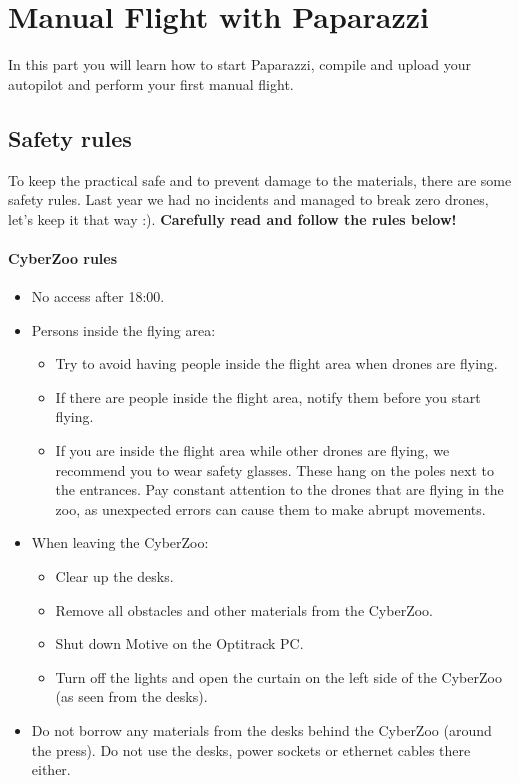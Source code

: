 \chapter{Manual Flight with Paparazzi}
\label{ch:manual_flight}
In this part you will learn how to start Paparazzi, compile and upload your autopilot and perform your first manual flight.

\section{Safety rules}
To keep the practical safe and to prevent damage to the materials, there are some safety rules.
Last year we had no incidents and managed to break zero drones, let's keep it that way :).
\textbf{Carefully read and follow the rules below!}

\subsubsection*{CyberZoo rules}
\begin{itemize}
	\item No access after 18:00.
	\item Persons inside the flying area:
	\begin{itemize}
		\item Try to avoid having people inside the flight area when drones are flying.
		\item If there are people inside the flight area, notify them before you start flying.
		\item If you are inside the flight area while other drones are flying, we recommend you to wear safety glasses. These hang on the poles next to the entrances. Pay constant attention to the drones that are flying in the zoo, as unexpected errors can cause them to make abrupt movements.
	\end{itemize}
	\item When leaving the CyberZoo:
	\begin{itemize}
		\item Clear up the desks.
		\item Remove all obstacles and other materials from the CyberZoo.
		\item Shut down Motive on the Optitrack PC.
		\item Turn off the lights and open the curtain on the left side of the CyberZoo (as seen from the desks).
	\end{itemize}
	\item Do not borrow any materials from the desks behind the CyberZoo (around the press). Do not use the desks, power sockets or ethernet cables there either.
\end{itemize}

